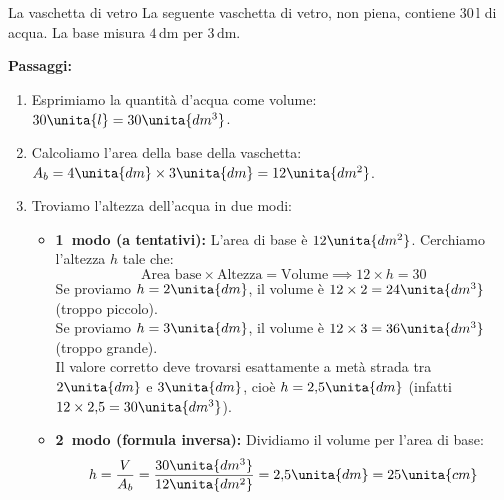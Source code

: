 \condnewpage

\begin{esercizio}{La vaschetta di vetro}
La seguente vaschetta di vetro, non piena, contiene $30\,\mathrm{l}$ di acqua. La base misura $4\,\mathrm{dm}$ per $3\,\mathrm{dm}$.



\responsespace{5.8cm}
\condnewpage

\begin{soluzione}
  \textbf{Passaggi:}
  \begin{enumerate}
    \item Esprimiamo la quantità d'acqua come volume: $30\unita{l} = 30\unita{dm^3}$.
    \item Calcoliamo l'area della base della vaschetta: $A_b = 4\unita{dm} \times 3\unita{dm} = 12\unita{dm^2}$.
    \item Troviamo l'altezza dell'acqua in due modi:
    \begin{itemize}
      \item \textbf{1\textdegree\ modo (a tentativi):} L'area di base è $12\unita{dm^2}$. Cerchiamo l'altezza $h$ tale che:
      \[
      \text{Area base} \times \text{Altezza} = \text{Volume} \implies 12 \times h = 30
      \]
      Se proviamo $h = 2\unita{dm}$, il volume è $12 \times 2 = 24\unita{dm^3}$ (troppo piccolo).\\
      Se proviamo $h = 3\unita{dm}$, il volume è $12 \times 3 = 36\unita{dm^3}$ (troppo grande).\\
      Il valore corretto deve trovarsi esattamente a metà strada tra $2\unita{dm}$ e $3\unita{dm}$, cioè $h = 2{,}5\unita{dm}$ (infatti $12 \times 2{,}5 = 30\unita{dm^3}$).
      \item \textbf{2\textdegree\ modo (formula inversa):} Dividiamo il volume per l'area di base:
      \[
      h = \frac{V}{A_b} = \frac{30\unita{dm^3}}{12\unita{dm^2}} = 2{,}5\unita{dm} = 25\unita{cm}
      \]
    \end{itemize}
  \end{enumerate}
\end{soluzione}
\end{esercizio}

